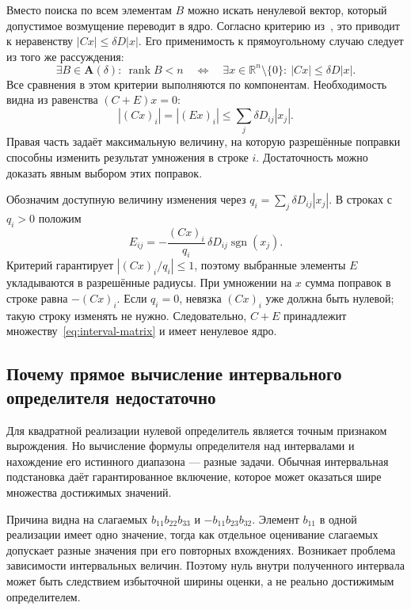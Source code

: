 \documentclass[12pt,a4paper]{article}
\newcommand{\rank}{\operatorname{rank}}
\newcommand{\sgn}{\operatorname{sgn}}
\begin{document}
Вместо поиска по всем элементам $B$ можно искать ненулевой вектор,
который допустимое возмущение переводит в ядро. Согласно критерию
из~\cite[раздел 1.2.5]{book}, это приводит к неравенству
$|Cx|\leq\delta D|x|$. Его применимость к прямоугольному случаю
следует из того же рассуждения:
\begin{equation}
\exists B\in\boldsymbol A(\delta):\ \rank B<n
\quad\Longleftrightarrow\quad
\exists x\in\mathbb R^n\setminus\{0\}:\ 
|Cx|\leq\delta D|x|.
\label{eq:criterion}
\end{equation}
Все сравнения в этом критерии выполняются по компонентам.
Необходимость видна из равенства $(C+E)x=0$:
\[
|(Cx)_i|=|(Ex)_i|\leq\sum_j\delta D_{ij}|x_j|.
\]
Правая часть задаёт максимальную величину, на которую разрешённые
поправки способны изменить результат умножения в строке $i$.
Достаточность можно доказать явным выбором этих поправок.

Обозначим доступную величину изменения через
$q_i=\sum_j\delta D_{ij}|x_j|$. В строках с $q_i>0$ положим
\begin{equation}
E_{ij}=
-\frac{(Cx)_i}{q_i}\,\delta D_{ij}\sgn(x_j).
\label{eq:construction}
\end{equation}
Критерий гарантирует $|(Cx)_i/q_i|\leq1$, поэтому выбранные
элементы $E$ укладываются в разрешённые радиусы. При умножении
на $x$ сумма поправок в строке равна $-(Cx)_i$.
Если $q_i=0$, невязка $(Cx)_i$ уже должна быть нулевой;
такую строку изменять не нужно. Следовательно, $C+E$ принадлежит
множеству~\eqref{eq:interval-matrix} и имеет ненулевое ядро.

\subsection{Почему прямое вычисление интервального определителя недостаточно}

Для квадратной реализации нулевой определитель является точным
признаком вырождения. Но вычисление формулы определителя над
интервалами и нахождение его истинного диапазона --- разные задачи.
Обычная интервальная подстановка даёт гарантированное включение,
которое может оказаться шире множества достижимых значений.

Причина видна на слагаемых $b_{11}b_{22}b_{33}$ и
$-b_{11}b_{23}b_{32}$. Элемент $b_{11}$ в одной реализации имеет
одно значение, тогда как отдельное оценивание слагаемых допускает
разные значения при его повторных вхождениях. Возникает проблема
зависимости интервальных величин.
Поэтому нуль внутри полученного интервала может быть следствием
избыточной ширины оценки, а не реально достижимым определителем.
\end{document}
